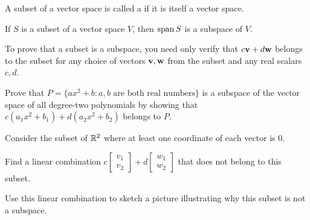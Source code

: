 \begin{applicationActivities}{4}{10}
\begin{definition}
  A subset of a vector space is called a  if it is
  itself a vector space.
\end{definition}

\begin{fact}
  If \(S\) is a subset of a vector space \(V\), then
  \(\operatorname{span} S\) is a subspace of \(V\).
\end{fact}

\begin{remark}
  To prove that a subset is a subspace, you need only verify that
  \(c\mathbf v+d\mathbf w\) belongs to the subset for any choice of
  vectors \(\mathbf v,\mathbf w\) from the subset and any real scalars \(c,d\).
\end{remark}

\begin{activity}{5}
  Prove that \(P=\{ax^2+b:a,b\text{ are both real numbers}\}\) is a subspace
  of the vector space of all degree-two polynomials by showing that
  \(c(a_1x^2+b_1)+d(a_2x^2+b_2)\) belongs to \(P\).
\end{activity}

\begin{activity}{10}
  Consider the subset of \(\mathbb{R}^2\) where at least one coordinate of
  each vector is \(0\).
  \begin{center}
  \end{center}
  \begin{subactivity}
    Find a linear combination
    \(c\begin{bmatrix}v_1\\v_2\end{bmatrix}+
    d\begin{bmatrix}w_1\\w_2\end{bmatrix}\) that does not
    belong to this subset.
  \end{subactivity}
  \begin{subactivity}
    Use this linear combination to sketch a picture
    illustrating why this subset is not
    a subspace.
  \end{subactivity}
\end{activity}


\end{applicationActivities}

